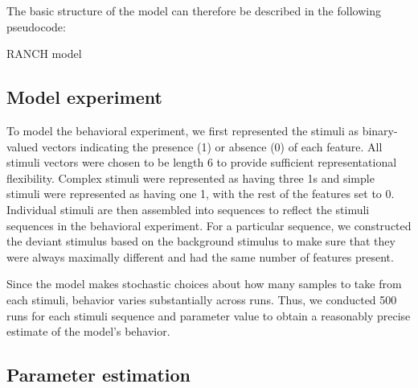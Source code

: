 \documentclass[10pt, letterpaper]{article}
\begin{document}
The basic structure of the model can therefore be described in the
following pseudocode:

\begin{algorithm}
  \caption*{RANCH model}\label{msn}
  \begin{algorithmic}
  \NoDo{}
    \NoThen{}
    \EndIf
    \EndWhile
  \EndFor
\end{algorithmic}
  \end{algorithm}

\hypertarget{model-experiment}{%
\subsection{Model experiment}\label{model-experiment}}

To model the behavioral experiment, we first represented the stimuli as
binary-valued vectors indicating the presence (1) or absence (0) of each
feature. All stimuli vectors were chosen to be length 6 to provide
sufficient representational flexibility. Complex stimuli were
represented as having three 1s and simple stimuli were represented as
having one 1, with the rest of the features set to 0. Individual stimuli
are then assembled into sequences to reflect the stimuli sequences in
the behavioral experiment. For a particular sequence, we constructed the
deviant stimulus based on the background stimulus to make sure that they
were always maximally different and had the same number of features
present.

Since the model makes stochastic choices about how many samples to take
from each stimuli, behavior varies substantially across runs. Thus, we
conducted 500 runs for each stimuli sequence and parameter value to
obtain a reasonably precise estimate of the model's behavior.

\hypertarget{parameter-estimation}{%
\subsection{Parameter estimation}\label{parameter-estimation}}
\end{document}

